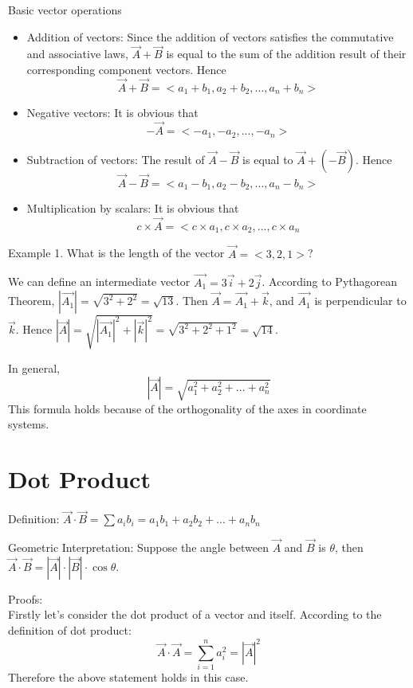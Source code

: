 \documentclass{article}
\begin{document}
Basic vector operations
\begin{itemize}
	\item Addition of vectors: Since the addition of vectors satisfies the
	commutative and associative laws, $\vec{A} + \vec{B}$ is equal to the sum
	of the addition result of their corresponding component vectors. Hence
	\[ \vec{A} + \vec{B} = <a_{1} + b_{1}, a_{2} + b_{2}, ..., a_{n} + b_{n}> \]
	
	\item Negative vectors: It is obvious that
	\[ -\vec{A} = <-a_{1}, -a_{2}, ..., -a_{n}> \]
	
	\item Subtraction of vectors: The result of $\vec{A} - \vec{B}$ is equal to
	$\vec{A} + (-\vec{B})$. Hence
	\[ \vec{A} - \vec{B} = <a_{1} - b_{1}, a_{2} - b_{2}, ..., a_{n} - b_{n}> \]
	
	\item Multiplication by scalars: It is obvious that
	\[ c \times \vec{A} = <c \times a_{1}, c \times a_{2}, ..., c \times a_{n} \]
\end{itemize}

Example 1. What is the length of the vector $\vec{A} = <3, 2, 1>$?

We can define an intermediate vector $\vec{A_{1}} = 3\vec{i} + 2\vec{j}$.
According to Pythagorean Theorem, $|\vec{A_{1}}| = \sqrt{3^2 + 2^2} = \sqrt{13}$.
Then $\vec{A} = \vec{A_{1}} + \vec{k}$, and $\vec{A_{1}}$ is perpendicular to
$\vec{k}$. Hence $|\vec{A}| = \sqrt{|\vec{A_{1}}|^2 + |\vec{k}|^2} =
\sqrt{3^2 + 2^2 + 1^2} = \sqrt{14}$.

In general,
\[ |\vec{A}| = \sqrt{a_{1}^{2} + a_{2}^{2} + ... + a_{n}^{2}} \]
This formula holds because of the orthogonality of the axes in coordinate
systems.

\section{Dot Product}

Definition: $\vec{A} \cdot \vec{B} = \sum a_{i}b_{i} = a_{1}b_{1} + a_{2}b_{2} +
... + a_{n}b_{n}$

Geometric Interpretation: Suppose the angle between $\vec{A}$ and $\vec{B}$ is
$\theta$, then $\vec{A} \cdot \vec{B} = |\vec{A}| \cdot |\vec{B}| \cdot \cos\theta$.

Proofs:\\
Firstly let's consider the dot product of a vector and itself. According to the
definition of dot product:
\[ \vec{A} \cdot \vec{A} = \sum_{i=1}^{n}a_{i}^2 = |\vec{A}|^2 \]
Therefore the above statement holds in this case.
\end{document}
